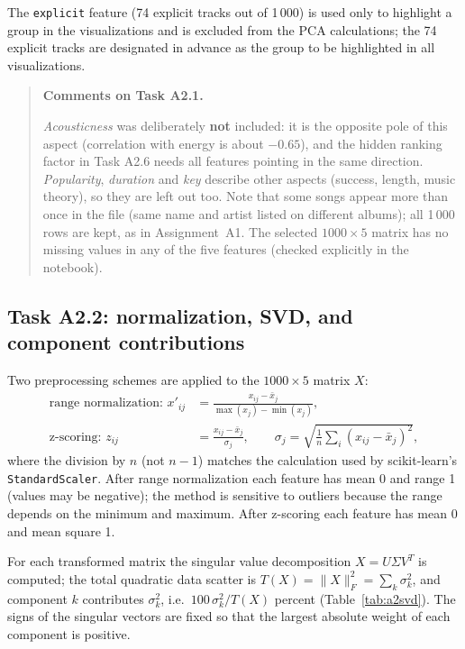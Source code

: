 \documentclass[11pt,letterpaper]{article}
\newenvironment{taskcomments}[1][Comments]{%
  \par\medskip\noindent
  \begin{quote}\small\textbf{#1.}\enspace\ignorespaces
}{%
  \end{quote}\medskip
}
\begin{document}
The \texttt{explicit} feature (74 explicit tracks out of 1\,000) is used only
to highlight a group in the visualizations and is excluded from the PCA
calculations; the 74 explicit tracks are designated in advance as the group to
be highlighted in all visualizations.

\begin{taskcomments}[Comments on Task A2.1]
\emph{Acousticness} was deliberately \textbf{not} included: it is the opposite
pole of this aspect (correlation with energy is about $-0.65$), and the hidden
ranking factor in Task A2.6 needs all features pointing in the same
direction. \emph{Popularity}, \emph{duration} and \emph{key} describe other
aspects (success, length, music theory), so they are left out too. Note that
some songs appear more than once in the file (same name and artist listed on
different albums); all 1\,000 rows are kept, as in Assignment~A1. The
selected $1000\times 5$ matrix has no missing values in any of the five
features (checked explicitly in the notebook).
\end{taskcomments}

\subsection{Task A2.2: normalization, SVD, and component contributions}\label{sec:a2svd}

Two preprocessing schemes are applied to the $1000\times5$ matrix $X$:
\begin{align}
  \text{range normalization: } x'_{ij} &= \frac{x_{ij} - \bar{x}_j}
        {\max(x_j) - \min(x_j)}, \\
  \text{z-scoring: } z_{ij} &= \frac{x_{ij} - \bar{x}_j}{\sigma_j},
  \qquad
  \sigma_j = \sqrt{\tfrac{1}{n}\textstyle\sum_i (x_{ij}-\bar x_j)^2},
\end{align}
where the division by $n$ (not $n-1$) matches the calculation used by
scikit-learn's \texttt{StandardScaler}. After range normalization each
feature has mean 0 and range 1 (values may be negative); the method is
sensitive to outliers because the range depends on the minimum and maximum.
After z-scoring each feature has mean 0 and mean square 1.

For each transformed matrix the singular value decomposition $X = U\Sigma V^T$
is computed; the total quadratic data scatter is
$T(X)=\|X\|_F^2=\sum_k \sigma_k^2$, and component $k$ contributes
$\sigma_k^2$, i.e.\ $100\,\sigma_k^2/T(X)$ percent
(Table~\ref{tab:a2svd}). The signs of the singular vectors are fixed so that
the largest absolute weight of each component is positive.
\end{document}
